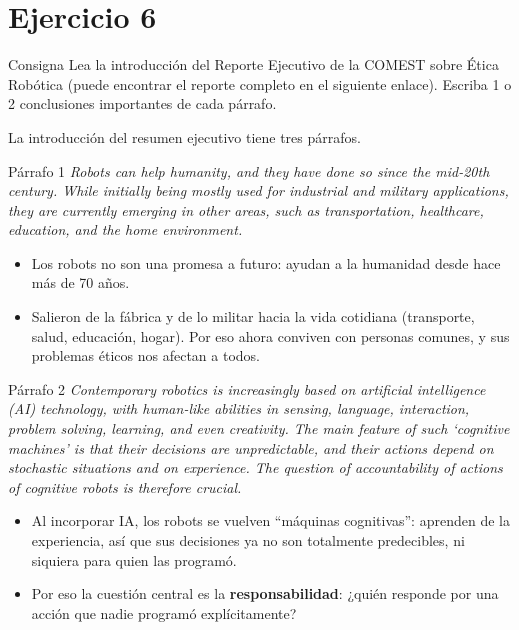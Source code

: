 \documentclass[11pt,a4paper]{article}
\begin{document}
\section{Ejercicio 6}

\begin{enunciado}{Consigna}
Lea la introducción del Reporte Ejecutivo de la COMEST sobre Ética Robótica (puede encontrar el reporte completo en el siguiente enlace). Escriba 1 o 2 conclusiones importantes de cada párrafo.
\end{enunciado}

La introducción del resumen ejecutivo tiene tres párrafos.

\begin{enunciado}{Párrafo 1}
\textit{Robots can help humanity, and they have done so since the mid-20th century. While initially being mostly used for industrial and military applications, they are currently emerging in other areas, such as transportation, healthcare, education, and the home environment.}
\end{enunciado}
\begin{itemize}
  \item Los robots no son una promesa a futuro: ayudan a la humanidad desde hace más de 70 años.
  \item Salieron de la fábrica y de lo militar hacia la vida cotidiana (transporte, salud, educación, hogar). Por eso ahora conviven con personas comunes, y sus problemas éticos nos afectan a todos.
\end{itemize}

\begin{enunciado}{Párrafo 2}
\textit{Contemporary robotics is increasingly based on artificial intelligence (AI) technology, with human-like abilities in sensing, language, interaction, problem solving, learning, and even creativity. The main feature of such `cognitive machines' is that their decisions are unpredictable, and their actions depend on stochastic situations and on experience. The question of accountability of actions of cognitive robots is therefore crucial.}
\end{enunciado}
\begin{itemize}
  \item Al incorporar IA, los robots se vuelven ``máquinas cognitivas'': aprenden de la experiencia, así que sus decisiones ya no son totalmente predecibles, ni siquiera para quien las programó.
  \item Por eso la cuestión central es la \textbf{responsabilidad}: ¿quién responde por una acción que nadie programó explícitamente?
\end{itemize}
\end{document}
